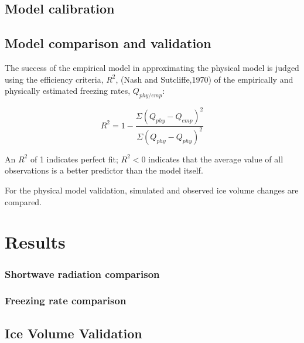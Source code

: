\documentclass[tc, manuscript]{copernicus}
\begin{document}

\subsection{Model calibration}
\subsection{Model comparison and validation}
The success of the empirical model in approximating the physical model is judged using the efficiency criteria,
$R^2$, (Nash and Sutcliffe,1970) of the empirically and physically estimated freezing rates, $Q_{phy/emp}$: 

\begin{equation}
  R^2 = 1 - \frac{\Sigma(Q_{phy} - Q_{emp})^2}{\Sigma(Q_{phy} - Q_{phy})^2}
\end{equation}

An $R^2$ of 1 indicates perfect fit; $R^2<0$ indicates that the average value of all observations is a better
predictor than the model itself. 

For the physical model validation, simulated and observed ice volume changes are compared.

\section{Results}

\subsubsection{Shortwave radiation comparison}

\subsubsection{Freezing rate comparison}

\subsection{Ice Volume Validation}

\end{document}
